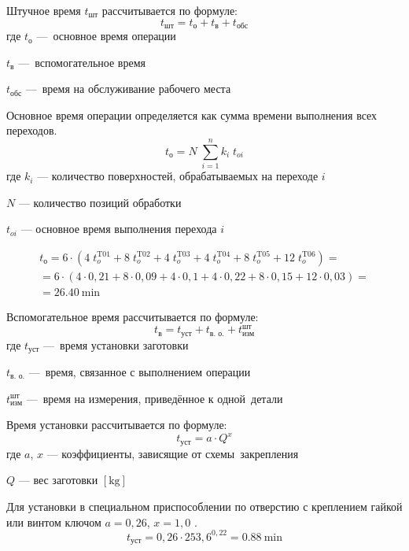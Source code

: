 \documentclass[14pt,russian,a4paper]{extreport}
\begin{document}
Штучное время $t_\text{шт}$ рассчитывается по формуле:
\begin{equation}
  t_\text{шт} = t_\text{о} + t_\text{в} + t_\text{обс}
\end{equation}
где $t_\text{о}$ --- основное время операции \par
$t_\text{в}$ --- вспомогательное время \par
$t_\text{обс}$ --- время на обслуживание рабочего места

Основное время операции определяется как сумма времени выполнения всех переходов.
\begin{equation}
  t_\text{о} = N \; \sum_{i=1}^n k_i \; t_{oi}
\end{equation}
где $k_i$ --- количество поверхностей, обрабатываемых на переходе $i$ \par
$N$ --- количество позиций обработки \par
$t_{oi}$ --- основное время выполнения перехода $i$

\begin{multline*}
  t_\text{о} = 6 \cdot ( 4 \; t_{o}^\text{T01} + 8 \; t_{o}^\text{T02} + 4 \; 
  t_{o}^\text{T03} + 4 \; t_{o}^\text{T04} + 8 \; t_{o}^\text{T05} + 12 \; t_{o}^\text{T06} ) = \\ = 6 \cdot ( 4 \cdot 0,21 + 8 \cdot 0,09 + 4 \cdot 0,1 + 4 \cdot 0,22 + 8 \cdot 0,15 + 12 \cdot 0,03 ) = \\ = \SI{26,40}{\minute}
\end{multline*}

Вспомогательное время рассчитывается по формуле:
\begin{equation}
  t_\text{в} = t_\text{уст} + t_\text{в. о.} + t_\text{изм}^\text{шт}
\end{equation}
где $t_\text{уст}$ --- время установки заготовки \par
$t_\text{в. о.}$ --- время, связанное с выполнением операции \par
$t_\text{изм}^\text{шт}$ --- время на измерения, приведённое к одной детали

Время установки рассчитывается по формуле:
\begin{equation}
  t_\text{уст} = a \cdot Q^x
\end{equation}
где $a$, $x$ --- коэффициенты, зависящие от схемы закрепления \par
$Q$ --- вес заготовки $\left[\si{\kilo\gram}\right]$

Для установки в специальном приспособлении по отверстию с креплением гайкой или винтом ключом $ a = 0,26 $, $ x = 1,0 $ \cite[прил.~3]{malzen:normirovanie}.
\begin{equation*}
  t_\text{уст} = 0,26 \cdot 253,6^{0,22} = \SI{0,88}{\minute}
\end{equation*}
\end{document}
